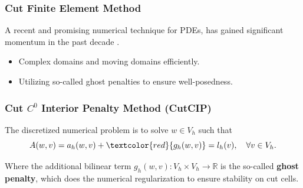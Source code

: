 \begin{frame}
\frametitle{Cut Finite Element Method}

A recent and promising numerical technique for PDEs, has gained significant momentum in the past decade \footnotemark[1]\footnotemark[2].

\begin{block}{}
    \begin{itemize}
        \item  Complex domains and moving domains efficiently.
        \item Utilizing so-called ghost penalties to ensure well-posedness.
    \end{itemize}
\end{block}

\end{frame}


\begin{frame}
\frametitle{ Cut $C^0$ Interior Penalty Method (CutCIP) }

\begin{block}{}
The discretized numerical problem is to solve $w \in V_{h}$ such that
\begin{equation*}
\label{eq:CP_A_F}
A( w, v )  = a_{h}( w,v) + \textcolor{red}{g_{h}( w,v)}  = l_{h}( v), \quad \forall v \in V_{h}  .
\end{equation*}

Where the additional bilinear term $g_{h}( w,v) : V_{h} \times V_{h} \to  \mathbb{R} $ is the so-called \textbf{ghost penalty}, which does the numerical regularization to ensure stability on cut cells.

\end{block}

\end{frame}

